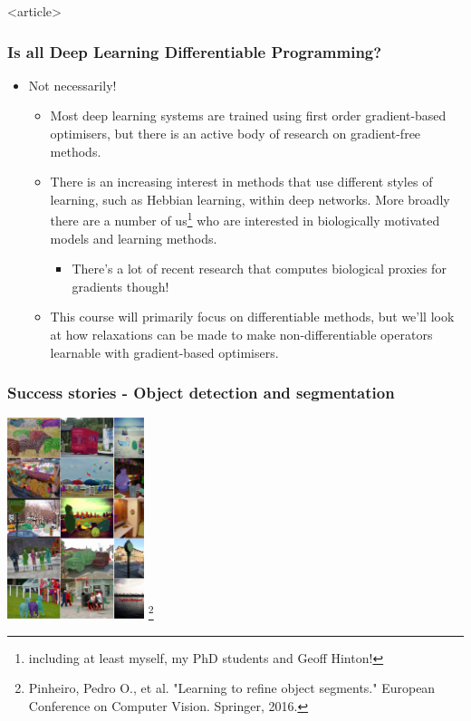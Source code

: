 \documentclass[]{article}
\newcommand\blfootnote[1]{%
  \begingroup
  \renewcommand\thefootnote{}\footnote{#1}%
  \addtocounter{footnote}{-1}%
  \endgroup
}
\begin{document}
\begin{frame}<article>
\frametitle{Is all Deep Learning Differentiable Programming?}
\begin{itemize}
	\item Not necessarily!
	\begin{itemize}
		\item<+-> Most deep learning systems are trained using first order gradient-based optimisers, but there is an active body of research on gradient-free methods.
		\item<+-> There is an increasing interest in methods that use different styles of learning, such as Hebbian learning, within deep networks. More broadly there are a number of us\footnote{including at least myself, my PhD students and Geoff Hinton!} who are interested in biologically motivated models and learning methods.
		\begin{itemize}
			\item<+-> There's a lot of recent research that computes biological proxies for gradients though!
		\end{itemize}

		\item<+-> This course will primarily focus on differentiable methods, but we'll look at how relaxations can be made to make non-differentiable operators learnable with gradient-based optimisers.
	\end{itemize}
\end{itemize}
\end{frame}

\begin{frame}
	\frametitle{Success stories - Object detection and segmentation}
	\centering \includegraphics[width=0.3\textwidth]{objseg.pdf}\blfootnote{Pinheiro, Pedro O., et al. "Learning to refine object segments." European Conference on Computer Vision. Springer, 2016.}
\end{frame}
\end{document}
